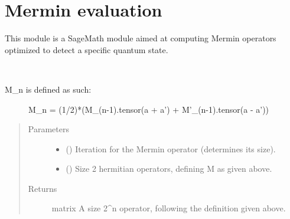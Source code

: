 \documentclass[letterpaper,10pt,english]{sphinxmanual}
\begin{document}
\section{Mermin evaluation}
\label{\detokenize{mermin_eval:module-mermin_eval}}\label{\detokenize{mermin_eval:mermin-evaluation}}\label{\detokenize{mermin_eval::doc}}
This module is a SageMath module aimed at computing Mermin operators optimized 
to detect a specific quantum state.

\begin{fulllineitems}
\label{\detokenize{mermin_eval:mermin_eval.M}}~\begin{description}
\item[{M\_n is defined as such:}] \leavevmode
M\_n = (1/2)*(M\_(n-1).tensor(a + a’) + M’\_(n-1).tensor(a - a’))

\end{description}
\begin{quote}\begin{description}
\item[{Parameters}] \leavevmode\begin{itemize}
\item {} 
 () \textendash{} Iteration for the Mermin operator (determines its size).

\item {} 
\sphinxstyleliteralstrong{\sphinxupquote{,}} () \textendash{} Size 2 hermitian operators, defining M as
given above.

\end{itemize}

\item[{Returns}] \leavevmode
matrix \textendash{} A size 2\textasciicircum{}n operator, following the definition given 
above.

\end{description}\end{quote}

\end{fulllineitems}

\end{document}
